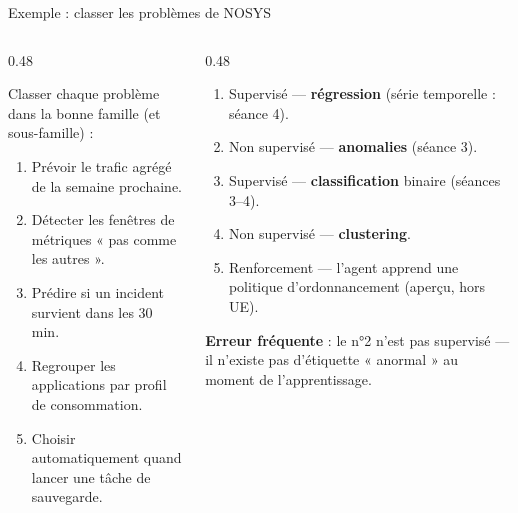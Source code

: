 \begin{frame}{Exemple : classer les problèmes de NOSYS}
\begin{columns}[t]
\begin{column}{0.48\textwidth}
\begin{abox}
Classer chaque problème dans la bonne famille (et sous-famille) :
\begin{enumerate}
\item Prévoir le trafic agrégé de la semaine prochaine.
\item Détecter les fenêtres de métriques « pas comme les autres ».
\item Prédire si un incident survient dans les 30 min.
\item Regrouper les applications par profil de consommation.
\item Choisir automatiquement quand lancer une tâche de sauvegarde.
\end{enumerate}
\end{abox}
\end{column}
\begin{column}{0.48\textwidth}
\begin{solbox}[Corrigé]
\begin{enumerate}
\item Supervisé --- \textbf{régression} (série temporelle : séance 4).
\item Non supervisé --- \textbf{anomalies} (séance 3).
\item Supervisé --- \textbf{classification} binaire (séances 3--4).
\item Non supervisé --- \textbf{clustering}.
\item Renforcement --- l'agent apprend une politique d'ordonnancement
(aperçu, hors UE).
\end{enumerate}
\textbf{Erreur fréquente} : le n°2 n'est pas supervisé --- il n'existe pas
d'étiquette « anormal » au moment de l'apprentissage.
\end{solbox}
\end{column}
\end{columns}
\end{frame}

